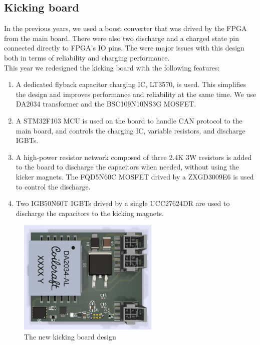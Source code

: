 \documentclass[runningheads]{llncs}
\begin{document}
\subsection{Kicking board}
In the previous years, we used a boost converter that was drived by the FPGA from the main board. There were also two discharge and a charged state pin connected directly to FPGA's IO pins. The were major issues with this design both in terms of reliability and charging performance.\\
This year we redesigned the kicking board with the following features:
\begin{enumerate}
    \item A dedicated flyback capacitor charging IC, LT3570, is used. This simplifies the design and improves performance and reliability at the same time. We use DA2034 transformer and the BSC109N10NS3G MOSFET.
    \item A STM32F103 MCU is used on the board to handle CAN protocol to the main board, and controls the charging IC, variable resistors, and discharge IGBTs.
    \item A high-power resistor network composed of three 2.4K 3W resistors is added to the board to discharge the capacitors when needed, without using the kicker magnets. The FQD5N60C MOSFET drived by a ZXGD3009E6 is used to control the discharge.
    \item Two IGB50N60T IGBTs drived by a single UCC27624DR are used to discharge the capacitors to the kicking magnets. 
\end{enumerate}

\begin{figure}
	\centering
	\includegraphics[width=0.6\textwidth]{images/mikona.png}
	\caption{The new kicking board design}
	\label{fig:MAG_ENC}
\end{figure}\\
\end{document}
